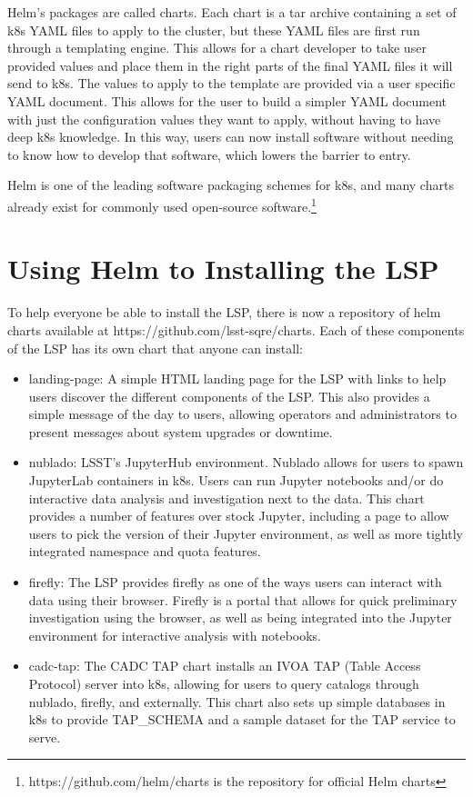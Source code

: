 \documentclass[11pt,twoside]{article}
\begin{document}
Helm's packages are called charts.  Each chart is a tar archive containing a set of
k8s YAML files to apply to the cluster, but these YAML files are first run through
a templating engine.  This allows for a chart developer to take user provided values
and place them in the right parts of the final YAML files it will send to k8s.
The values to apply to the template are provided via a user specific YAML document.
This allows for the user to build a simpler YAML document with just the configuration
values they want to apply, without having to have deep k8s knowledge.  In this way,
users can now install software without needing to know how to develop that software,
which lowers the barrier to entry.

Helm is one of the leading software packaging schemes for k8s, and many charts
already exist for commonly used open-source software.\footnote{https://github.com/helm/charts
is the repository for official Helm charts}

\section{Using Helm to Installing the LSP}

To help everyone be able to install the LSP, there is now a repository of helm
charts available at https://github.com/lsst-sqre/charts.  Each of these components
of the LSP has its own chart that anyone can install:

\begin{itemize}

\item landing-page: A simple HTML landing page for the LSP with links to help users
discover the different components of the LSP.  This also provides a simple message of
the day to users, allowing operators and administrators to present messages about
system upgrades or downtime.

\item nublado: LSST's JupyterHub environment.  Nublado allows for users to spawn
JupyterLab containers in k8s.  Users can run Jupyter notebooks and/or do interactive
data analysis and investigation next to the data.  This chart provides a number of
features over stock Jupyter, including a page to allow users to pick the version of
their Jupyter environment, as well as more tightly integrated namespace and quota
features.

\item firefly: The LSP provides firefly as one of the ways users can interact with
data using their browser.  Firefly is a portal that allows for quick preliminary
investigation using the browser, as well as being integrated into the Jupyter
environment for interactive analysis with notebooks.

\item cadc-tap: The CADC TAP chart installs an IVOA TAP (Table Access Protocol)
server into k8s, allowing for users to query catalogs through nublado, firefly,
and externally.  This chart also sets up simple databases in k8s to provide
TAP\_SCHEMA and a sample dataset for the TAP service to serve.

\end{itemize}
\end{document}
